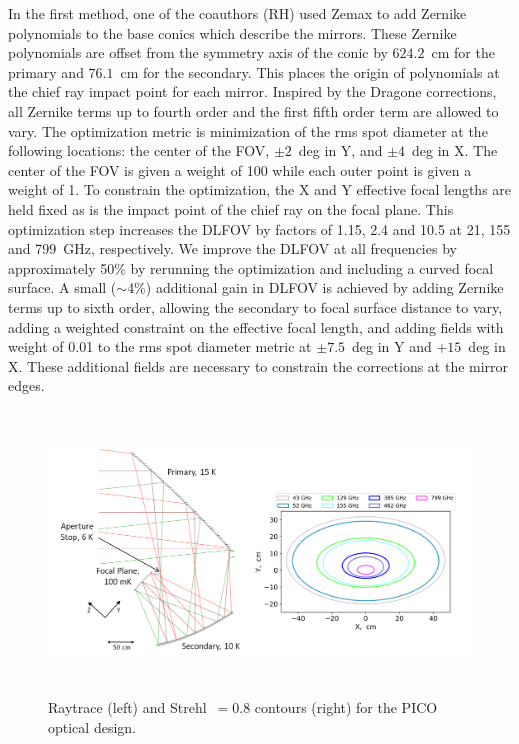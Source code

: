 \documentclass[]{spie}  %
\newcommand{\comr}[1]{\textcolor{red}{#1}}
\newcommand{\comb}[1]{\textcolor{blue}{#1}}
\newcommand{\como}[1]{\textcolor{orange}{#1}}
\begin{document}
In the first method, one of the coauthors (RH) used Zemax to add Zernike 
polynomials to the base conics which describe the mirrors. These Zernike polynomials are offset from the symmetry axis of the conic 
by $624.2$~cm for the primary and $76.1$~cm for the secondary.  
This places the origin of polynomials at the chief ray impact point for each mirror. 
Inspired by the Dragone corrections, all Zernike terms up to fourth order and the first fifth order term are allowed to vary. 
The optimization metric is minimization of the rms spot diameter at 
the following locations: the center of the FOV, $\pm2$~deg in Y, and $\pm4$~deg in X. The center of the FOV is given a weight of 100
while each outer point is given a weight of 1. To constrain the optimization, the X and Y 
effective focal lengths are held fixed as is the impact point of the chief ray on the focal plane. 
This optimization step increases the DLFOV
by factors of 1.15, 2.4 and 10.5 at 21, 155 and 799~GHz, respectively. 
We improve the DLFOV at all frequencies by approximately 50\% by rerunning the optimization and including a curved focal surface. A small ($\sim$4\%) additional gain in DLFOV is achieved by adding Zernike terms 
up to sixth order, allowing the secondary to focal surface distance to vary, adding a weighted constraint on the effective focal length, 
and adding fields with weight of 0.01 to the rms spot diameter metric at $\pm7.5$~deg in Y and $+15$~deg in X. 
These additional fields are necessary to constrain the corrections at the mirror edges.



\begin{figure} [ht]
\begin{center}
\includegraphics[height=7.5cm]{jpl_ray_strehl.png}
\end{center}
\caption { \label{fig:ray} \label{fig:strehl} 
Raytrace (left) and Strehl~$=0.8$ contours (right) for the PICO optical design.
}
\end{figure} 
\end{document}
